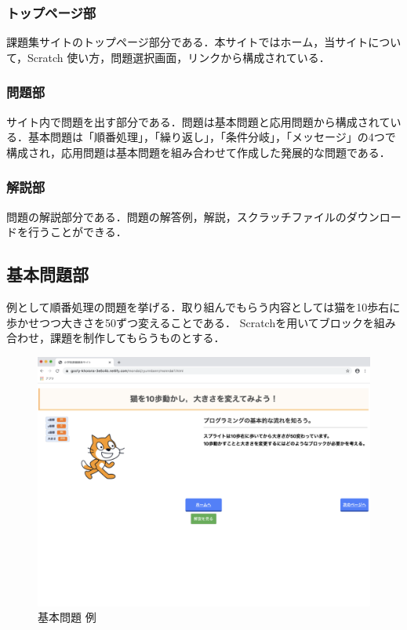 \subsubsection{トップページ部}
課題集サイトのトップページ部分である．本サイトではホーム，当サイトについて，Scratch 使い方，問題選択画面，リンクから構成されている．

\subsubsection{問題部}
サイト内で問題を出す部分である．問題は基本問題と応用問題から構成されている．基本問題は「順番処理」，「繰り返し」，「条件分岐」，「メッセージ」の4つで構成され，応用問題は基本問題を組み合わせて作成した発展的な問題である．

\subsubsection{解説部}
問題の解説部分である．問題の解答例，解説，スクラッチファイルのダウンロードを行うことができる．

\subsection{基本問題部}
例として順番処理の問題を挙げる．取り組んでもらう内容としては猫を10歩右に歩かせつつ大きさを50ずつ変えることである．
Scratchを用いてブロックを組み合わせ，課題を制作してもらうものとする．


\begin{figure}[h]
\begin{center}
\includegraphics[width=15cm]{zyunnbanntoi.pdf}
\caption{基本問題 例}
\label{fig:houhou}
\end{center}
\end{figure}

